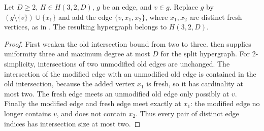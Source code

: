 \begin{helper}
Let $D\ge2$, $H\in H(3,2,D)$, $g$ be an edge, and $v\in g$.
Replace $g$ by $(g\setminus\{v\})\cup\{x_1\}$ and add the edge
$\{v,x_1,x_2\}$, where $x_1,x_2$ are distinct fresh vertices, as in
. The resulting hypergraph belongs to
$H(3,2,D)$.
\end{helper}
\begin{proof}
First weaken the old intersection bound from two to three.
 then supplies uniformity three and
maximum degree at most $D$ for the split hypergraph. For 2-simplicity,
intersections of two unmodified old edges are unchanged. The intersection
of the modified edge with an unmodified old edge is contained in the old
intersection, because the added vertex $x_1$ is fresh, so it has cardinality
at most two. The fresh edge meets an unmodified old edge only possibly at
$v$. Finally the modified edge and fresh edge meet exactly at $x_1$:
the modified edge no longer contains $v$, and does not contain $x_2$.
Thus every pair of distinct edge indices has intersection size at most two.
\end{proof}
